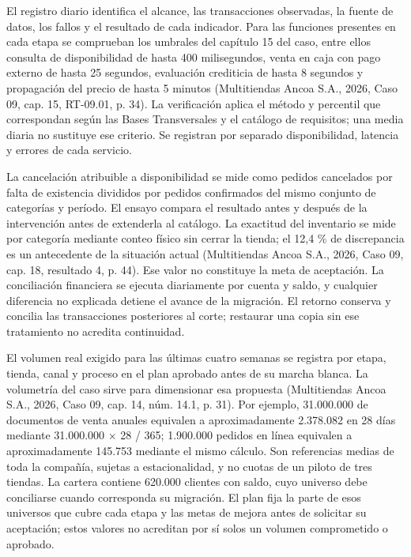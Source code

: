 \documentclass[11pt]{article}
\begin{document}
El registro diario identifica el alcance, las transacciones observadas, la fuente de datos, los fallos y el resultado de cada indicador. Para las funciones presentes en cada etapa se comprueban los umbrales del capítulo 15 del caso, entre ellos consulta de disponibilidad de hasta 400 milisegundos, venta en caja con pago externo de hasta 25 segundos, evaluación crediticia de hasta 8 segundos y propagación del precio de hasta 5 minutos (Multitiendas Ancoa S.A., 2026, Caso 09, cap. 15, RT-09.01, p. 34). La verificación aplica el método y percentil que correspondan según las Bases Transversales y el catálogo de requisitos; una media diaria no sustituye ese criterio. Se registran por separado disponibilidad, latencia y errores de cada servicio.

La cancelación atribuible a disponibilidad se mide como pedidos cancelados por falta de existencia divididos por pedidos confirmados del mismo conjunto de categorías y período. El ensayo compara el resultado antes y después de la intervención antes de extenderla al catálogo. La exactitud del inventario se mide por categoría mediante conteo físico sin cerrar la tienda; el 12,4 \% de discrepancia es un antecedente de la situación actual (Multitiendas Ancoa S.A., 2026, Caso 09, cap. 18, resultado 4, p. 44). Ese valor no constituye la meta de aceptación. La conciliación financiera se ejecuta diariamente por cuenta y saldo, y cualquier diferencia no explicada detiene el avance de la migración. El retorno conserva y concilia las transacciones posteriores al corte; restaurar una copia sin ese tratamiento no acredita continuidad.

El volumen real exigido para las últimas cuatro semanas se registra por etapa, tienda, canal y proceso en el plan aprobado antes de su marcha blanca. La volumetría del caso sirve para dimensionar esa propuesta (Multitiendas Ancoa S.A., 2026, Caso 09, cap. 14, núm. 14.1, p. 31). Por ejemplo, 31.000.000 de documentos de venta anuales equivalen a aproximadamente 2.378.082 en 28 días mediante 31.000.000 \(\times\) 28 / 365; 1.900.000 pedidos en línea equivalen a aproximadamente 145.753 mediante el mismo cálculo. Son referencias medias de toda la compañía, sujetas a estacionalidad, y no cuotas de un piloto de tres tiendas. La cartera contiene 620.000 clientes con saldo, cuyo universo debe conciliarse cuando corresponda su migración. El plan fija la parte de esos universos que cubre cada etapa y las metas de mejora antes de solicitar su aceptación; estos valores no acreditan por sí solos un volumen comprometido o aprobado.
\end{document}
